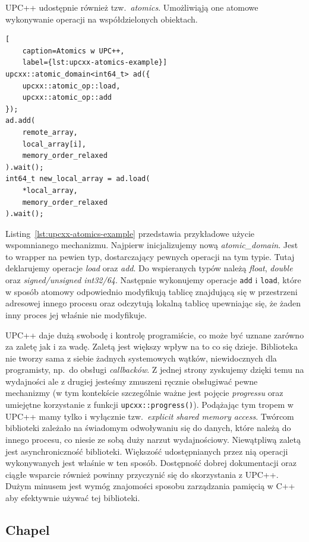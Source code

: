 \documentclass[twocolumn]{article}
\begin{document}
UPC++ udostępnie również tzw.\ \textit{atomics}.
Umożliwiąją one atomowe wykonywanie operacji na
współdzielonych obiektach.
\begin{lstlisting}[
    caption=Atomics w UPC++,
    label={lst:upcxx-atomics-example}]
upcxx::atomic_domain<int64_t> ad({
    upcxx::atomic_op::load,
    upcxx::atomic_op::add
});
ad.add(
    remote_array,
    local_array[i],
    memory_order_relaxed
).wait();
int64_t new_local_array = ad.load(
    *local_array,
    memory_order_relaxed
).wait();
\end{lstlisting}
Listing~\ref{lst:upcxx-atomics-example} przedstawia przykładowe użycie wspomnianego mechanizmu.
Najpierw inicjalizujemy nową \textit{atomic\_domain}.
Jest to wrapper na pewien typ, dostarczający pewnych operacji na tym typie.
Tutaj deklarujemy operacje \textit{load} oraz \textit{add}.
Do wspieranych typów należą \textit{float}, \textit{double} oraz \textit{signed/unsigned int32/64}.
Następnie wykonujemy operacje \texttt{add} i \texttt{load}, które w sposób atomowy odpowiednio
modyfikują tablicę znajdującą się w przestrzeni adresowej innego procesu oraz odczytują lokalną
tablicę upewniając się, że żaden inny proces jej właśnie nie modyfikuje.

UPC++ daje dużą swobodę i kontrolę programiście, co może być uznane
zarówno za zaletę jak i za wadę.
Zaletą jest większy wpływ na to co się dzieje.
Biblioteka nie tworzy sama z siebie żadnych
systemowych wątków, niewidocznych dla programisty, np.\ do obsługi
\textit{callbacków}.
Z jednej strony zyskujemy dzięki temu na wydajności
ale z drugiej jesteśmy zmuszeni ręcznie obsługiwać pewne mechanizmy
(w tym kontekście szczególnie ważne jest pojęcie \textit{progressu} oraz
umiejętne korzystanie z funkcji \texttt{upcxx::progress()}).
Podążając tym
tropem w UPC++ mamy tylko i wyłącznie tzw.\ \textit{explicit shared memory access}.
Twórcom biblioteki zależało na świadomym odwoływaniu się do danych, które należą do
innego procesu, co niesie ze sobą duży narzut wydajnościowy.
Niewątpliwą zaletą jest asynchroniczność biblioteki.
Większość udostępnianych
przez nią operacji wykonywanych jest właśnie w ten sposób.
Dostępność dobrej dokumentacji oraz ciągłe wsparcie również powinny
przyczynić się do skorzystania z UPC++.
Dużym minusem jest wymóg znajomości sposobu zarządzania pamięcią
w C++ aby efektywnie używać tej biblioteki.

\subsection{Chapel}
\end{document}
